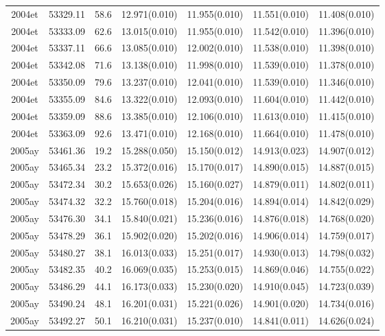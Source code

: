 \begin{table*}
\begin{tabular}{ccccccc}
2004et	  & 53329.11	 & 58.6	& 12.971(0.010)	 & 11.955(0.010)	 & 11.551(0.010)	 & 11.408(0.010) \\ 
2004et	  & 53333.09	 & 62.6	& 13.015(0.010)	 & 11.955(0.010)	 & 11.542(0.010)	 & 11.396(0.010) \\ 
2004et	  & 53337.11	 & 66.6	& 13.085(0.010)	 & 12.002(0.010)	 & 11.538(0.010)	 & 11.398(0.010) \\ 
2004et	  & 53342.08	 & 71.6	& 13.138(0.010)	 & 11.998(0.010)	 & 11.539(0.010)	 & 11.378(0.010) \\ 
2004et	  & 53350.09	 & 79.6	& 13.237(0.010)	 & 12.041(0.010)	 & 11.539(0.010)	 & 11.346(0.010) \\ 
2004et	  & 53355.09	 & 84.6	& 13.322(0.010)	 & 12.093(0.010)	 & 11.604(0.010)	 & 11.442(0.010) \\ 
2004et	  & 53359.09	 & 88.6	& 13.385(0.010)	 & 12.106(0.010)	 & 11.613(0.010)	 & 11.415(0.010) \\ 
2004et	  & 53363.09	 & 92.6	& 13.471(0.010)	 & 12.168(0.010)	 & 11.664(0.010)	 & 11.478(0.010) \\ 
2005ay	  & 53461.36	 & 19.2	& 15.288(0.050)	 & 15.150(0.012)	 & 14.913(0.023)	 & 14.907(0.012) \\ 
2005ay	  & 53465.34	 & 23.2	& 15.372(0.016)	 & 15.170(0.017)	 & 14.890(0.015)	 & 14.887(0.015) \\ 
2005ay	  & 53472.34	 & 30.2	& 15.653(0.026)	 & 15.160(0.027)	 & 14.879(0.011)	 & 14.802(0.011) \\ 
2005ay	  & 53474.32	 & 32.2	& 15.760(0.018)	 & 15.204(0.016)	 & 14.894(0.014)	 & 14.842(0.029) \\ 
2005ay	  & 53476.30	 & 34.1	& 15.840(0.021)	 & 15.236(0.016)	 & 14.876(0.018)	 & 14.768(0.020) \\ 
2005ay	  & 53478.29	 & 36.1	& 15.902(0.020)	 & 15.202(0.016)	 & 14.906(0.014)	 & 14.759(0.017) \\ 
2005ay	  & 53480.27	 & 38.1	& 16.013(0.033)	 & 15.251(0.017)	 & 14.930(0.013)	 & 14.798(0.032) \\ 
2005ay	  & 53482.35	 & 40.2	& 16.069(0.035)	 & 15.253(0.015)	 & 14.869(0.046)	 & 14.755(0.022) \\ 
2005ay	  & 53486.29	 & 44.1	& 16.173(0.033)	 & 15.230(0.020)	 & 14.910(0.045)	 & 14.723(0.039) \\ 
2005ay	  & 53490.24	 & 48.1	& 16.201(0.031)	 & 15.221(0.026)	 & 14.901(0.020)	 & 14.734(0.016) \\ 
2005ay	  & 53492.27	 & 50.1	& 16.210(0.031)	 & 15.237(0.010)	 & 14.841(0.011)	 & 14.626(0.024) \\ 

\end{tabular}
\end{table*}

